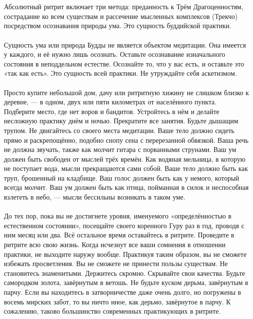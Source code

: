 \\ \\ Абсолютный ритрит включает три метода: преданность к Трём Драгоценностям, сострадание ко всем существам и рассечение мысленных комплексов (Трекчо) посредством осознавания природы ума. Это сущность буддийской практики.
\\ \\ Сущность ума или природа Будды не является объектом медитации. Она имеется у каждого, и её нужно лишь осознать. Оставьте осознавание изначального состояния в неподдельном естестве. Осознайте то, что у вас есть, и оставьте это «так как есть». Это сущность всей практики. Не утруждайте себя аскетизмом.
\\ \\ Просто купите небольшой дом, дачу или ритритную хижину не слишком близко к деревне, — в одном, двух или пяти километрах от населённого пункта. Подберите место, где нет воров и бандитов. Устройтесь в нём и делайте несложную практику днём и ночью. Прекратите все занятия. Будьте дышащим трупом. Не двигайтесь со своего места медитации. Ваше тело должно сидеть прямо и раскрепощённо, подобно снопу сена с перерезанной обвязкой. Ваша речь не должна звучать, также как молчит гитара с порванными струнами. Ваш ум должен быть свободен от мыслей трёх времён. Как водяная мельница, в которую не поступает вода, мысли прекращаются сами собой. Ваше тело должно быть как труп, брошенный на кладбище. Ваш голос должен быть как у немого, который всегда молчит. Ваш ум должен быть как птица, пойманная в силок и неспособная взлететь в небо, — мысли бессильны возникать в таком уме.
\\ \\ До тех пор, пока вы не достигнете уровня, именуемого «определённостью в естественном состоянии», посещайте своего коренного Гуру раз в год, проводя с ним месяц или два. Всё остальное время оставайтесь в ритрите. Проведите в ритрите всю свою жизнь. Когда исчезнут все ваши сомнения в отношении практики, не выходите наружу вообще. Практикуя таким образом, вы не сможете избежать просветления. Вы не сможете не принести пользы существам. Не становитесь знаменитыми. Держитесь скромно. Скрывайте свои качества. Будьте самородком золота, завёрнутым в ветошь. Не будьте куском дерьма, завёрнутым в парчу. Если вы находитесь в затворничестве даже очень долго, но погружены в восемь мирских забот, то вы ничто иное, как дерьмо, завёрнутое в парчу. К сожалению, таково большинство современных практикующих в ритрите.
